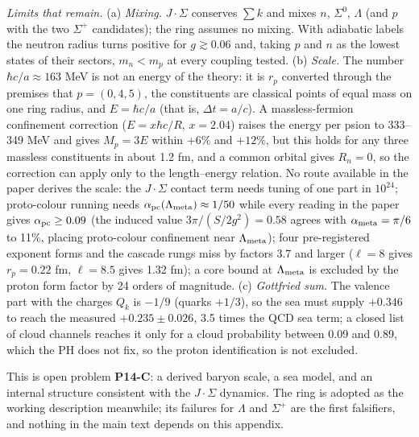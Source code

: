 \noindent \emph{Limits that remain.} (a) \emph{Mixing.} $J\!\cdot\!\Sigma$ conserves $\sum k$ and mixes $n$, $\Sigma^0$, $\Lambda$ (and $p$ with the two $\Sigma^+$ candidates); the ring assumes no mixing. With adiabatic labels the neutron radius turns positive for $g\gtrsim0.06$ and, taking $p$ and $n$ as the lowest states of their sectors, $m_n<m_p$ at every coupling tested. (b) \emph{Scale.} The number $\hbar c/a\approx163$ MeV is not an energy of the theory: it is $r_p$ converted through the premises that $p=(0,4,5)$, the constituents are classical points of equal mass on one ring radius, and $E=\hbar c/a$ (that is, $\Delta t=a/c$). A massless-fermion confinement correction ($E=x\hbar c/R$, $x=2.04$) raises the energy per psion to 333--349 MeV and gives $M_p=3E$ within $+6\%$ and $+12\%$, but this holds for any three massless constituents in about 1.2 fm, and a common orbital gives $R_n=0$, so the correction can apply only to the length--energy relation. No route available in the paper derives the scale: the $J\!\cdot\!\Sigma$ contact term needs tuning of one part in $10^{24}$; proto-colour running needs $\alpha_{\rm pc}(\Lambda_{\rm meta})\approx1/50$ while every reading in the paper gives $\alpha_{\rm pc}\ge0.09$ (the induced value $3\pi/(S/2g^2)=0.58$ agrees with $\alpha_{\rm meta}=\pi/6$ to 11\%, placing proto-colour confinement near $\Lambda_{\rm meta}$); four pre-registered exponent forms and the cascade rungs miss by factors 3.7 and larger ($\ell=8$ gives $r_p=0.22$ fm, $\ell=8.5$ gives 1.32 fm); a core bound at $\Lambda_{\rm meta}$ is excluded by the proton form factor by 24 orders of magnitude. (c) \emph{Gottfried sum.} The valence part with the charges $Q_k$ is $-1/9$ (quarks $+1/3$), so the sea must supply $+0.346$ to reach the measured $+0.235\pm0.026$, 3.5 times the QCD sea term; a closed list of cloud channels reaches it only for a cloud probability between 0.09 and 0.89, which the PH does not fix, so the proton identification is not excluded.

\noindent This is open problem \textbf{P14-C}: a derived baryon scale, a sea model, and an internal structure consistent with the $J\!\cdot\!\Sigma$ dynamics. The ring is adopted as the working description meanwhile; its failures for $\Lambda$ and $\Sigma^+$ are the first falsifiers, and nothing in the main text depends on this appendix.
